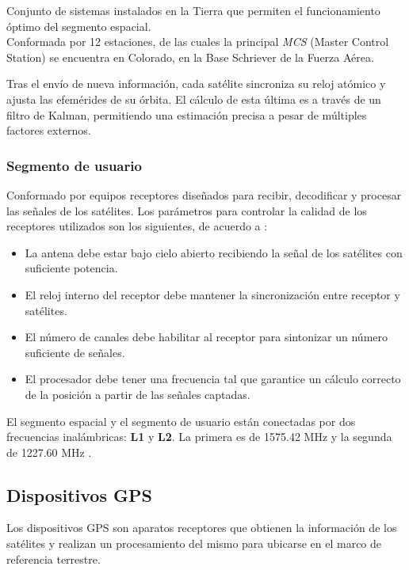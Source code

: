 Conjunto de sistemas instalados en la Tierra que permiten el funcionamiento óptimo del segmento espacial.\\

Conformada por 12 estaciones, de las cuales la principal \textit{MCS} (Master Control Station\footnotemark) se encuentra en Colorado, en la Base Schriever de la Fuerza Aérea.\\


Tras el envío de nueva información, cada satélite sincroniza su reloj atómico y ajusta las efemérides de su órbita. El cálculo de esta última es a través de un filtro de Kalman, permitiendo una estimación precisa a pesar de múltiples factores externos.

\subsubsection{Segmento de usuario}

Conformado por equipos receptores diseñados para recibir, decodificar y procesar las señales de los satélites. Los parámetros para controlar la calidad de los receptores utilizados son los siguientes, de acuerdo a \citep{termal2014prototipo}:

\begin{itemize}
	\item La antena debe estar bajo cielo abierto recibiendo la señal de los satélites con suficiente potencia.
	\item El reloj interno del receptor debe mantener la sincronización entre receptor y satélites.
	\item El número de canales debe habilitar al receptor para sintonizar un número suficiente de señales.
	\item El procesador debe tener una frecuencia tal que garantice un cálculo correcto de la posición a partir de las señales captadas.	
\end{itemize}

El segmento espacial y el segmento de usuario están conectadas por dos frecuencias inalámbricas: \textbf{L1} y \textbf{L2}. La primera es de 1575.42 MHz y la segunda de 1227.60 MHz \citep{farrell2008aided}.

\subsection{Dispositivos GPS}
Los dispositivos GPS son aparatos receptores que obtienen la información de los satélites y realizan un procesamiento del mismo para ubicarse en el marco de referencia terrestre. \\

